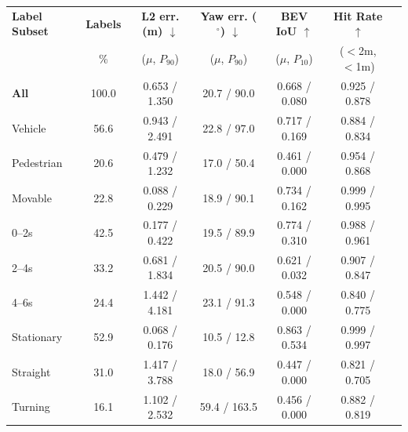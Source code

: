 \begin{tabular}{lcccccc}
\toprule
\textbf{Label Subset} & \textbf{Labels} & \textbf{L2 err. (m) $\downarrow$} & \textbf{Yaw err. ($^\circ$) $\downarrow$} & \textbf{BEV IoU $\uparrow$} & \textbf{Hit Rate $\uparrow$} \\
 & \% & ($\mu$, $P_{90}$) & ($\mu$, $P_{90}$) & ($\mu$, $P_{10}$) & ($<$2m, $<$1m) \\
\midrule \midrule
\textbf{All} & 100.0 & 0.653 / 1.350 & 20.7 / 90.0 & 0.668 / 0.080 & 0.925 / 0.878 \\
\midrule
Vehicle & 56.6 & 0.943 / 2.491 & 22.8 / 97.0 & 0.717 / 0.169 & 0.884 / 0.834 \\
Pedestrian & 20.6 & 0.479 / 1.232 & 17.0 / 50.4 & 0.461 / 0.000 & 0.954 / 0.868 \\
Movable & 22.8 & 0.088 / 0.229 & 18.9 / 90.1 & 0.734 / 0.162 & 0.999 / 0.995 \\
\midrule
0--2s & 42.5 & 0.177 / 0.422 & 19.5 / 89.9 & 0.774 / 0.310 & 0.988 / 0.961 \\
2--4s & 33.2 & 0.681 / 1.834 & 20.5 / 90.0 & 0.621 / 0.032 & 0.907 / 0.847 \\
4--6s & 24.4 & 1.442 / 4.181 & 23.1 / 91.3 & 0.548 / 0.000 & 0.840 / 0.775 \\
\midrule
Stationary & 52.9 & 0.068 / 0.176 & 10.5 / 12.8 & 0.863 / 0.534 & 0.999 / 0.997 \\
Straight & 31.0 & 1.417 / 3.788 & 18.0 / 56.9 & 0.447 / 0.000 & 0.821 / 0.705 \\
Turning & 16.1 & 1.102 / 2.532 & 59.4 / 163.5 & 0.456 / 0.000 & 0.882 / 0.819 \\
\bottomrule
\end{tabular}
